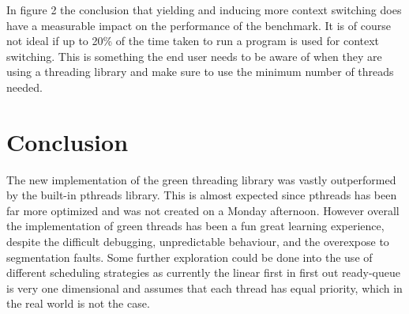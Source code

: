 \documentclass[a4paper,10pt]{article}
\begin{document}
\noindent In figure 2 the conclusion that yielding and inducing more context switching does have a measurable impact on the performance of the benchmark. It is of course not ideal if up to 20\% of the time taken to run a program is used for context switching. This is something the end user needs to be aware of when they are using a threading library and make sure to use the minimum number of threads needed.

\section*{Conclusion}
The new implementation of the green threading library was vastly outperformed by the built-in pthreads library. This is almost expected since pthreads has been far more optimized and was not created on a Monday afternoon. However overall the implementation of green threads has been a fun great learning experience, despite the difficult debugging, unpredictable behaviour, and the overexpose to segmentation faults. Some further exploration could be done into the use of different scheduling strategies as currently the linear first in first out ready-queue is very one dimensional and assumes that each thread has equal priority, which in the real world is not the case. 
\end{document}

